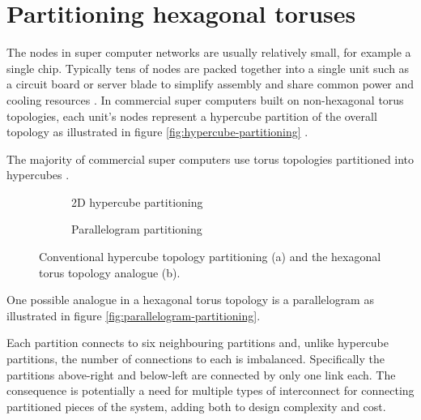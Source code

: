 \chapter{Partitioning hexagonal toruses}
	
	\label{sec:partitioning}
	
	The nodes in super computer networks are usually relatively small, for
	example a single chip. Typically tens of nodes are packed together into a
	single unit such as a circuit board or server blade to simplify assembly
	and share common power and cooling resources \cite{gilge14,ajima12}. In
	commercial super computers built on non-hexagonal torus topologies, each
	unit's nodes represent a hypercube partition of the overall topology as
	illustrated in figure \ref{fig:hypercube-partitioning}
	\cite{chen11,ajima12}.
	
	The majority of commercial
	super computers use torus topologies partitioned into hypercubes
	\cite{chen11,ajima12}.
	
	\begin{figure}
		\center
		\begin{subfigure}[b]{0.45\textwidth}
			\center
			\caption{2D hypercube partitioning}
			\label{fig:apdx-hypercube-partitioning}
		\end{subfigure}
		\begin{subfigure}[b]{0.45\textwidth}
			\center
			\caption{Parallelogram partitioning}
			\label{fig:apdx-parallelogram-partitioning}
		\end{subfigure}
		
		\caption[Torus partitioning.]%
		{Conventional hypercube topology partitioning (a) and the
		hexagonal torus topology analogue (b).}
		\label{fig:apdx-partitioning-options}
	\end{figure}
	
	One possible analogue in a hexagonal torus topology is a parallelogram as
	illustrated in figure \ref{fig:parallelogram-partitioning}.
	
	Each partition connects to six neighbouring partitions and, unlike
	hypercube partitions, the number of connections to each is imbalanced.
	Specifically the partitions above-right and below-left are connected by
	only one link each. The consequence is potentially a need for multiple
	types of interconnect for connecting partitioned pieces of the system,
	adding both to design complexity and cost.
	
